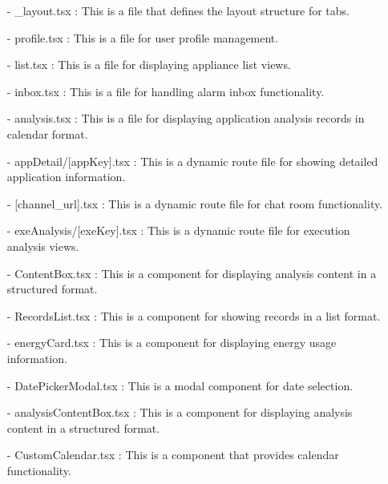 \documentclass[conference]{IEEEtran}
\begin{document}
\begin{enumerate}
\begin{itemize}
\begin{itemize}
\begin{enumerate}
\begin{enumerate}
        \item[-] \_layout.tsx : This is a file that defines the layout structure for tabs. \\
        \item[-] profile.tsx : This is a file for user profile management.\\
        \item[-] list.tsx : This is a file for displaying appliance list views.\\
        \item[-] inbox.tsx : This is a file for handling alarm inbox functionality.\\
        \item[-] analysis.tsx : This is a file for displaying application analysis records in calendar format.\\

        \item[-] appDetail/[appKey].tsx : This is a dynamic route file for showing detailed application information.\\
        
        \item[-] [channel\_url].tsx : This is a dynamic route file for chat room functionality.\\
        
        \item[-] exeAnalysis/[exeKey].tsx : This is a dynamic route file for execution analysis views.\\
        \item[-] ContentBox.tsx : This is a component for displaying analysis content in a structured format.\\
        \item[-] RecordsList.tsx : This is a component for showing records in a list format.\\
        \item[-] energyCard.tsx : This is a component for displaying energy usage information. \\
        \item[-] DatePickerModal.tsx : This is a modal component for date selection.\\
        \item[-] analysisContentBox.tsx : This is a component for displaying analysis content in a structured format.\\
        \item[-] CustomCalendar.tsx : This is a component that provides calendar functionality.\\
        

\end{enumerate}
\end{enumerate}
\end{itemize}
\end{itemize}
\end{enumerate}
\end{document}

